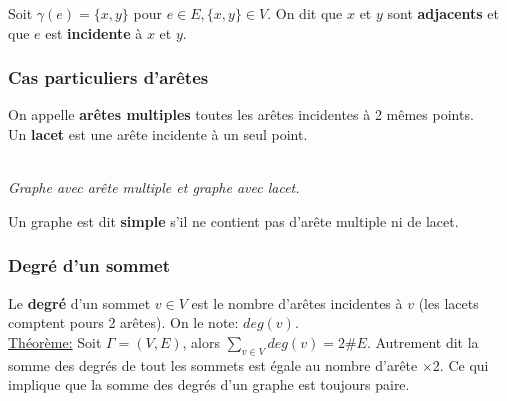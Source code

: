 \documentclass[11pt]{article}
\begin{document}
			Soit $\gamma(e)=\{x,y\}$ pour $e \in E, \{x, y\} \in V$. On dit que $x$ et $y$ sont \textbf{adjacents} et que $e$ est \textbf{incidente} à $x$ et $y$. \\
		
		\subsubsection{Cas particuliers d'arêtes}
			On appelle \textbf{arêtes multiples} toutes les arêtes incidentes à 2 mêmes points.\\
			Un \textbf{lacet} est une arête incidente à un seul point.
			\begin{center}
			 \\
			\textit{Graphe avec arête multiple et graphe avec lacet.} \\
			\end{center}
		Un graphe est dit \textbf{simple} s'il ne contient pas d'arête multiple ni de lacet.
		
		\subsubsection{Degré d'un sommet}
			Le \textbf{degré} d'un sommet $v \in V$ est le nombre d'arêtes incidentes à $v$ (les lacets comptent pours 2 arêtes). On le note: $deg(v)$.\\
			
			\underline{Théorème:} Soit $\Gamma = (V,E)$, alors $\displaystyle \sum_{v \in V} deg(v) = 2\# E$. Autrement dit la somme des degrés de tout les sommets est égale au nombre d'arête $\times$2. Ce qui implique que la somme des degrés d'un graphe est toujours paire.\\
			
\end{document}
